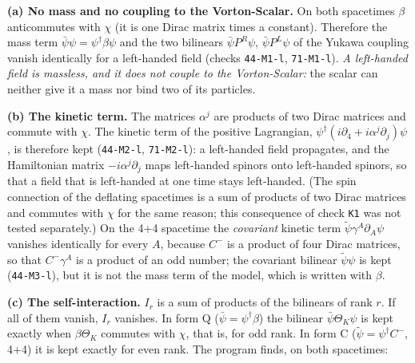 \documentclass[
  10pt,
]{article}
\begin{document}
\textbf{(a) No mass and no coupling to the Vorton-Scalar.} On both
spacetimes \(\beta\) anticommutes with \(\chi\) (it is one Dirac matrix
times a constant). Therefore the mass term
\(\bar\psi\psi=\psi^\dagger\beta\psi\) and the two bilinears
\(\bar\psi P^R\psi\), \(\bar\psi P^L\psi\) of the Yukawa coupling vanish
identically for a left-handed field (checks \texttt{44-M1-l},
\texttt{71-M1-l}). \emph{A left-handed field is massless, and it does
not couple to the Vorton-Scalar:} the scalar can neither give it a mass
nor bind two of its particles.

\textbf{(b) The kinetic term.} The matrices \(\alpha^j\) are products of
two Dirac matrices and commute with \(\chi\). The kinetic term of the
positive Lagrangian,
\(\psi^\dagger(i\partial_4+i\alpha^j\partial_j)\psi\), is therefore kept
(\texttt{44-M2-l}, \texttt{71-M2-l}): a left-handed field propagates,
and the Hamiltonian matrix \(-i\alpha^j\partial_j\) maps left-handed
spinors onto left-handed spinors, so that a field that is left-handed at
one time stays left-handed. (The spin connection of the deflating
spacetimes is a sum of products of two Dirac matrices and commutes with
\(\chi\) for the same reason; this consequence of check \texttt{K1} was
not tested separately.) On the 4+4 spacetime the \emph{covariant}
kinetic term \(\tilde\psi\gamma^A\partial_A\psi\) vanishes identically
for every \(A\), because \(C^-\) is a product of four Dirac matrices, so
that \(C^-\gamma^A\) is a product of an odd number; the covariant
bilinear \(\tilde\psi\psi\) is kept (\texttt{44-M3-l}), but it is not
the mass term of the model, which is written with \(\beta\).

\textbf{(c) The self-interaction.} \(I_r\) is a sum of products of the
bilinears of rank \(r\). If all of them vanish, \(I_r\) vanishes. In
form Q (\(\bar\psi=\psi^\dagger\beta\)) the bilinear
\(\bar\psi\Theta_K\psi\) is kept exactly when \(\beta\Theta_K\) commutes
with \(\chi\), that is, for odd rank. In form C
(\(\tilde\psi=\psi^\dagger C^-\), 4+4) it is kept exactly for even rank.
The program finds, on both spacetimes:
\end{document}

